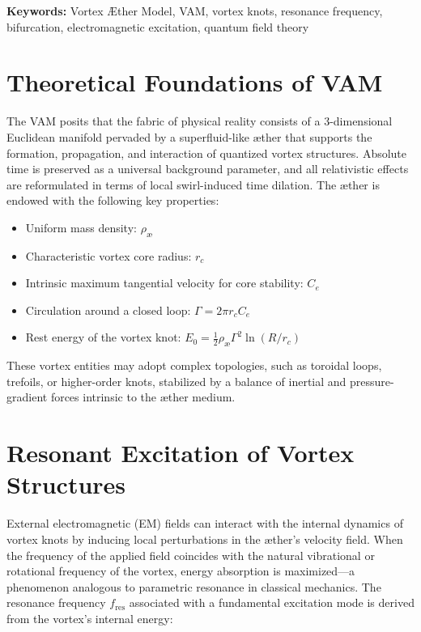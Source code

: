\documentclass[a4paper, aps,preprint,superscriptaddress, 12pt]{revtex4}
\begin{document}
        \vspace{1cm}
        \textbf{Keywords:} Vortex Æther Model, VAM, vortex knots, resonance frequency, bifurcation, electromagnetic excitation, quantum field theory
\maketitle


\section{Theoretical Foundations of VAM}

The VAM posits that the fabric of physical reality consists of a 3-dimensional Euclidean manifold pervaded by a superfluid-like \ae{}ther that supports the formation, propagation, and interaction of quantized vortex structures. Absolute time is preserved as a universal background parameter, and all relativistic effects are reformulated in terms of local swirl-induced time dilation. The \ae{}ther is endowed with the following key properties:


\begin{itemize}
    \item Uniform mass density: $\rho_\text{\ae}$
    \item Characteristic vortex core radius: $r_c$
    \item Intrinsic maximum tangential velocity for core stability: $C_e$
    \item Circulation around a closed loop: $\Gamma = 2\pi r_c C_e$
    \item Rest energy of the vortex knot: $E_0 = \frac{1}{2} \rho_\text{\ae} \Gamma^2 \ln(R/r_c)$
\end{itemize}


These vortex entities may adopt complex topologies, such as toroidal loops, trefoils, or higher-order knots, stabilized by a balance of inertial and pressure-gradient forces intrinsic to the \ae{}ther medium.


\section{Resonant Excitation of Vortex Structures}

External electromagnetic (EM) fields can interact with the internal dynamics of vortex knots by inducing local perturbations in the \ae{}ther's velocity field. When the frequency of the applied field coincides with the natural vibrational or rotational frequency of the vortex, energy absorption is maximized—a phenomenon analogous to parametric resonance in classical mechanics. The resonance frequency $f_\text{res}$ associated with a fundamental excitation mode is derived from the vortex's internal energy:
\end{document}
